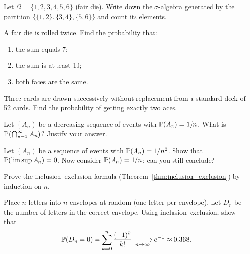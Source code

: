 \begin{exercise}
Let $\Omega = \{1,2,3,4,5,6\}$ (fair die). Write down the $\sigma$-algebra
generated by the partition $\bigl\{\{1,2\}, \{3,4\}, \{5,6\}\bigr\}$ and
count its elements.
\end{exercise}

\begin{exercise}
A fair die is rolled twice. Find the probability that:
\begin{enumerate}[label=(\alph*)]
    \item the sum equals 7;
    \item the sum is at least 10;
    \item both faces are the same.
\end{enumerate}
\end{exercise}

\begin{exercise}
Three cards are drawn successively without replacement from a standard deck of
52 cards. Find the probability of getting exactly two aces.
\end{exercise}

\begin{exercise}
Let $(A_n)$ be a decreasing sequence of events with $\mathbb{P}(A_n) = 1/n$.
What is $\mathbb{P}\bigl(\bigcap_{n=1}^{\infty} A_n\bigr)$? Justify your answer.
\end{exercise}

\begin{exercise}
Let $(A_n)$ be a sequence of events with $\mathbb{P}(A_n) = 1/n^2$.
Show that $\mathbb{P}(\limsup A_n) = 0$. Now consider $\mathbb{P}(A_n) = 1/n$: can you
still conclude?
\end{exercise}

\begin{exercise}
Prove the inclusion--exclusion formula (Theorem~\ref{thm:inclusion_exclusion})
by induction on $n$.
\end{exercise}

\begin{exercise}[Derangements]
Place $n$ letters into $n$ envelopes at random (one letter per envelope).
Let $D_n$ be the number of letters in the correct envelope. Using
inclusion--exclusion, show that
\[
    \mathbb{P}(D_n = 0) = \sum_{k=0}^{n} \frac{(-1)^k}{k!}
    \xrightarrow[n \to \infty]{} e^{-1} \approx 0.368.
\]
\end{exercise}
